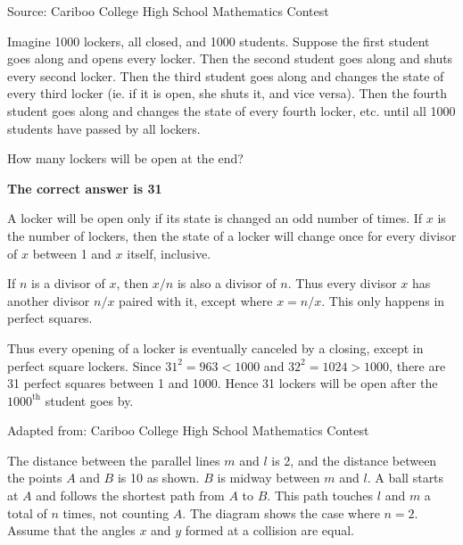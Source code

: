 \documentclass{article}
\begin{document}
\vskip 1.5cm


\scriptsize
Source: Cariboo College High School Mathematics Contest

\normalsize
Imagine 1000 lockers, all closed, and 1000 students. Suppose the first student goes along and opens every locker. Then the second student goes along and shuts every second locker. Then the third student goes along and changes the state of every third locker (ie. if it is open, she shuts it, and vice versa). Then the fourth student goes along and changes the state of every fourth locker, etc. until all 1000 students have passed by all lockers.

How many lockers will be open at the end?

\textbf{The correct answer is 31}

A locker will be open only if its state is changed an odd number of times. If $x$ is the number of lockers, then the state of a locker will change once for every divisor of $x$ between 1 and $x$ itself, inclusive.

If $n$ is a divisor of $x$, then $x/n$ is also a divisor of $n$. Thus every divisor $x$ has another divisor $n/x$ paired with it, except where $x = n/x$. This only happens in perfect squares.

Thus every opening of a locker is eventually canceled by a closing, except in perfect square lockers. Since $31^2=963<1000$ and $32^2=1024>1000$, there are 31 perfect squares between 1 and 1000. Hence 31 lockers will be open after the $1000^\text{th}$ student goes by.

\vskip 1.5cm


\scriptsize
Adapted from: Cariboo College High School Mathematics Contest

\normalsize
The distance between the parallel lines $m$ and $l$ is 2, and the distance between the points $A$ and $B$ is 10 as shown. $B$ is midway between $m$ and $l$. A ball starts at $A$ and follows the shortest path from $A$ to $B$. This path touches $l$ and $m$ a total of $n$ times, not counting $A$. The diagram shows the case where $n=2$. Assume that the angles $x$ and $y$ formed at a collision are equal.
\end{document}
